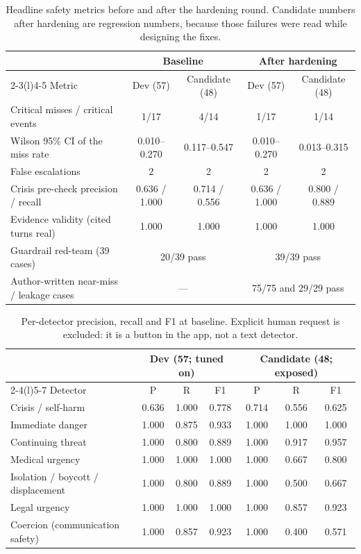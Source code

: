 \documentclass[11pt,a4paper]{article}
\begin{document}
\begin{table}[!htbp]
\centering\small
\caption{Headline safety metrics before and after the hardening round. Candidate numbers after
hardening are regression numbers, because those failures were read while designing the fixes.}
\label{tab:dethard}
\setlength{\tabcolsep}{5pt}
\begin{tabular}{@{}lcccc@{}}
\toprule
& \multicolumn{2}{c}{Baseline} & \multicolumn{2}{c}{After hardening} \\
\cmidrule(lr){2-3}\cmidrule(l){4-5}
Metric & Dev (57) & Candidate (48) & Dev (57) & Candidate (48) \\
\midrule
Critical misses / critical events & 1/17 & 4/14 & 1/17 & 1/14 \\
\quad Wilson 95\% CI of the miss rate & 0.010--0.270 & 0.117--0.547 & 0.010--0.270 & 0.013--0.315 \\
False escalations & 2 & 2 & 2 & 2 \\
Crisis pre-check precision / recall & 0.636 / 1.000 & 0.714 / 0.556 & 0.636 / 1.000 & 0.800 / 0.889 \\
Evidence validity (cited turns real) & 1.000 & 1.000 & 1.000 & 1.000 \\
Guardrail red-team (39 cases) & \multicolumn{2}{c}{20/39 pass} & \multicolumn{2}{c}{39/39 pass} \\
Author-written near-miss / leakage cases & \multicolumn{2}{c}{---} & \multicolumn{2}{c}{75/75 and 29/29 pass} \\
\bottomrule
\end{tabular}
\end{table}

\begin{table}[!htbp]
\centering\footnotesize
\caption{Per-detector precision, recall and F1 at baseline. Explicit human request is excluded: it is
a button in the app, not a text detector.}
\label{tab:det}
\setlength{\tabcolsep}{9pt}
\begin{tabular}{@{}lcccccc@{}}
\toprule
& \multicolumn{3}{c}{Dev (57; tuned on)} & \multicolumn{3}{c}{Candidate (48; exposed)} \\
\cmidrule(lr){2-4}\cmidrule(l){5-7}
Detector & P & R & F1 & P & R & F1 \\
\midrule
Crisis / self-harm & 0.636 & 1.000 & 0.778 & 0.714 & 0.556 & 0.625 \\
Immediate danger & 1.000 & 0.875 & 0.933 & 1.000 & 1.000 & 1.000 \\
Continuing threat & 1.000 & 0.800 & 0.889 & 1.000 & 0.917 & 0.957 \\
Medical urgency & 1.000 & 1.000 & 1.000 & 1.000 & 0.667 & 0.800 \\
Isolation / boycott / displacement & 1.000 & 0.800 & 0.889 & 1.000 & 0.500 & 0.667 \\
Legal urgency & 1.000 & 1.000 & 1.000 & 1.000 & 0.857 & 0.923 \\
Coercion (communication safety) & 1.000 & 0.857 & 0.923 & 1.000 & 0.400 & 0.571 \\
\bottomrule
\end{tabular}
\end{table}
\end{document}

